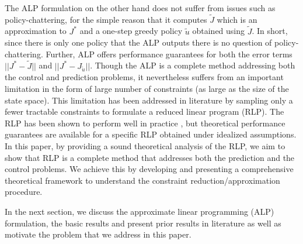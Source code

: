The ALP formulation \cite{ALP} on the other hand 
	does not suffer from issues such as policy-chattering, 
	for the simple reason that it computes $\tilde{J}$ 
	which is an approximation to $J^*$ 
	and a one-step greedy policy $\tilde{u}$ obtained using $\tilde{J}$. 
In short, since there is only one policy that the ALP outputs there is no question of policy-chattering. 
Further, ALP offers performance guarantees 
	for both the error terms $||J^*-\tilde{J}||$ and $||J^*-J_{\tilde{u}}||$. 
	Though the ALP is a complete method addressing 
		both the control and prediction problems, 
		it nevertheless suffers from an important limitation in the form of large number of constraints 
		(as large as the size of the state space). 
This limitation has been addressed in literature 
	by sampling only a fewer tractable constraints to formulate a reduced linear program (RLP). 
The RLP has been shown to perform well in practice \cite{ALP,CS,CST}, 
	but theoretical performance guarantees \cite{CS} are available for a specific RLP obtained under idealized assumptions. 
In this paper, by providing a sound theoretical analysis of the RLP, 
	we aim to show that RLP is a complete method that addresses both the prediction and the control problems.
We achieve this by developing and presenting 
	a comprehensive theoretical framework to understand the constraint reduction/approximation procedure. 

In the next section, we discuss the approximate linear programming (ALP) formulation, the basic results and present prior results in literature as well as motivate the problem that we address in this paper. 
